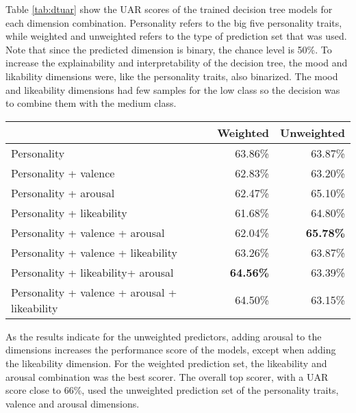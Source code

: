 Table \ref{tab:dtuar} show the UAR scores of the trained decision tree models for each dimension combination. Personality refers to the big five personality traits, while weighted and unweighted refers to the type of prediction set that was used. Note that since the predicted dimension is binary, the chance level is 50\%. To increase the explainability and interpretability of the decision tree, the mood and likability dimensions were, like the personality traits, also binarized. The mood and likeability dimensions had few samples for the low class so the decision was to combine them with the medium class.

\begin{table*}[]
\begin{tabular}{|l|r|r|}
\hline
\rowcolor{Gray}
 & \multicolumn{1}{l|}{Weighted} & \multicolumn{1}{l|}{Unweighted} \\ \hline
Personality & \cellcolor[HTML]{86CEAB}63.86\% & \cellcolor[HTML]{D1EDDF}63.87\% \\ \hline
Personality + valence & \cellcolor[HTML]{CBEADB}62.83\% & \cellcolor[HTML]{FCFEFD}63.20\% \\ \hline
Personality + arousal & \cellcolor[HTML]{E3F4EC}62.47\% & \cellcolor[HTML]{83CDA9}65.10\% \\ \hline
Personality + likeability & 61.68\% & 64.80\% \\ \hline
Personality + valence + arousal & \cellcolor[HTML]{FFFFFF}62.04\% & \cellcolor[HTML]{57BB8A}\textbf{65.78\%} \\ \hline
Personality + valence + likeability & 63.26\% & \cellcolor[HTML]{D1EDDF}63.87\% \\ \hline
Personality + likeability+ arousal & \cellcolor[HTML]{57BB8A}\textbf{64.56\%} & \cellcolor[HTML]{F0F9F5}63.39\% \\ \hline
Personality + valence + arousal + likeability & \cellcolor[HTML]{5CBD8D}64.50\% & \cellcolor[HTML]{FFFFFF}63.15\% \\ \hline
\end{tabular}
\caption{UAR scores of the modeled Decision Trees per dimension combination.}
\label{tab:dtuar}
\end{table*}

As the results indicate for the unweighted predictors, adding arousal to the dimensions increases the performance score of the models, except when adding the likeability dimension. For the weighted prediction set, the likeability and arousal combination was the best scorer. The overall top scorer, with a UAR score close to 66\%, used the unweighted prediction set of the personality traits, valence and arousal dimensions. 

